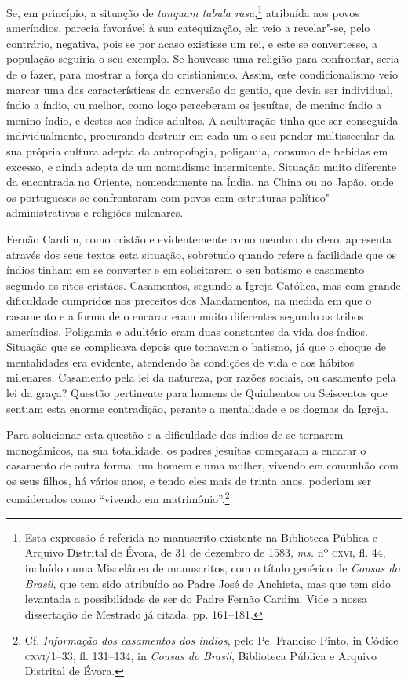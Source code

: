 Se, em princípio, a situação de \textit{tanquam tabula rasa},\footnote{ Esta 
expressão é referida no manuscrito existente
na Biblioteca Pública e Arquivo Distrital de Évora, de 31 de dezembro
de 1583, \textit{ms.} nº \textsc{cxvi}, fl. 44, incluído numa Miscelânea de
manuscritos, com o título genérico de \textit{Cousas do Brasil}, que
tem sido atribuído ao Padre José de Anchieta, mas que tem sido
levantada a possibilidade de ser do Padre Fernão Cardim. Vide a nossa
dissertação de Mestrado já citada, pp. 161--181.} atribuída
aos povos ameríndios, parecia favorável à sua catequização, ela veio a
revelar"-se, pelo contrário, negativa, pois se por acaso existisse um
rei, e este se convertesse, a população seguiria o seu exemplo. Se
houvesse uma religião para confrontar, seria de o fazer, para mostrar a
força do cristianismo. Assim, este condicionalismo veio marcar uma das
características da conversão do gentio, que devia ser individual, índio
a índio, ou melhor, como logo perceberam os jesuítas, de menino índio
a menino índio, e destes aos índios adultos. A aculturação tinha que
ser conseguida individualmente, procurando destruir em cada um o seu
pendor multissecular da sua própria cultura adepta da antropofagia,
poligamia, consumo de bebidas em excesso, e ainda adepta de um
nomadismo intermitente. Situação muito diferente da encontrada no
Oriente, nomeadamente na Índia, na China ou no Japão, onde os
portugueses se confrontaram com povos com estruturas
político"-administrativas e religiões milenares. 

Fernão Cardim, como cristão e evidentemente como membro do clero,
apresenta através dos seus textos esta situação, sobretudo quando
refere a facilidade que os índios tinham em se converter e em
solicitarem o seu batismo e casamento segundo os ritos cristãos.
Casamentos, segundo a Igreja Católica, mas com grande dificuldade
cumpridos nos preceitos dos Mandamentos, na medida em que o casamento e
a forma de o encarar eram muito diferentes segundo as tribos ameríndias.
Poligamia e adultério eram duas constantes da vida dos índios. Situação
que se complicava depois que tomavam o batismo, já que o choque de
mentalidades era evidente, atendendo às condições de vida e aos hábitos
milenares. Casamento pela lei da natureza, por razões sociais, ou
casamento pela lei da graça? Questão pertinente para homens de
Quinhentos ou Seiscentos que sentiam esta enorme contradição, perante
a mentalidade e os dogmas da Igreja.

Para solucionar esta questão e a dificuldade dos índios de se
tornarem monogâmicos, na sua totalidade, os padres jesuítas começaram a
encarar o casamento de outra forma: um homem e uma mulher, vivendo em
comunhão com os seus filhos, há vários anos, e tendo eles mais de trinta anos, 
poderiam ser considerados como ``vivendo em matrimônio''.\footnote{ Cf. \textit{Informação
dos casamentos dos índios}, pelo Pe. Franciso Pinto, in Códice
\textsc{cxvi}/1--33, fl. 131--134, in \textit{Cousas do Brasil}, Biblioteca
Pública e Arquivo Distrital de Évora.} 

